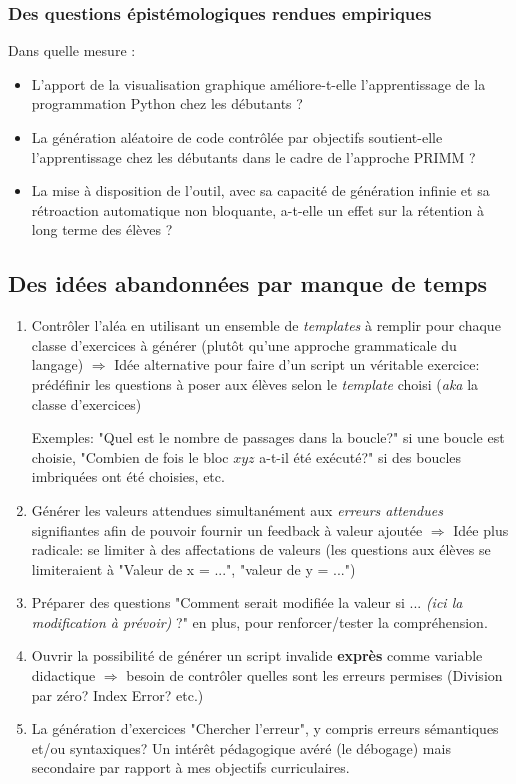 \documentclass[11pt,a4paper]{article}
\begin{document}
\subsubsection{Des questions épistémologiques rendues empiriques}
Dans quelle mesure :\begin{itemize}
    \item L'apport de la visualisation graphique améliore-t-elle l'apprentissage de la programmation Python chez les débutants ?
    \item La génération aléatoire de code contrôlée par objectifs soutient-elle l'apprentissage chez les débutants dans le cadre de l'approche PRIMM ?
    \item La mise à disposition de l'outil, avec sa capacité de génération infinie et sa rétroaction automatique non bloquante, a-t-elle un effet sur la rétention à long terme des élèves ?

\end{itemize}


\subsection{Des idées abandonnées par manque de temps}
\begin{enumerate}
    \item Contrôler l'aléa en utilisant un ensemble de \textit{templates} à remplir pour chaque classe d'exercices à générer (plutôt qu'une approche grammaticale du langage) $\Rightarrow$ Idée alternative pour faire d'un script un véritable exercice: prédéfinir les questions à poser aux élèves selon le \textit{template} choisi (\textit{aka} la classe d'exercices)\par Exemples: "Quel est le nombre de passages dans la boucle?" si une boucle est choisie, "Combien de fois le bloc $xyz$ a-t-il été exécuté?" si des boucles imbriquées ont été choisies, etc. 
    
    \item Générer les valeurs attendues simultanément aux \textit{erreurs attendues} signifiantes afin de pouvoir fournir un feedback à valeur ajoutée $\Rightarrow$ Idée plus radicale: se limiter à des affectations de valeurs (les questions aux élèves se limiteraient à "Valeur de x = ...", "valeur de y = ...")

    \item Préparer des questions "Comment serait modifiée la valeur si ... \textit{(ici la modification à prévoir)} ?" en plus, pour renforcer/tester la compréhension.
    
    \item Ouvrir la possibilité de générer un script invalide \textbf{exprès} comme variable didactique $\Rightarrow$ besoin de contrôler quelles sont les erreurs permises (Division par zéro? Index Error? etc.) 
    
    \item La génération d'exercices "Chercher l'erreur", y compris erreurs sémantiques et/ou syntaxiques? Un intérêt pédagogique avéré (le débogage) mais secondaire par rapport à mes objectifs curriculaires.
\end{enumerate}
\end{document}
